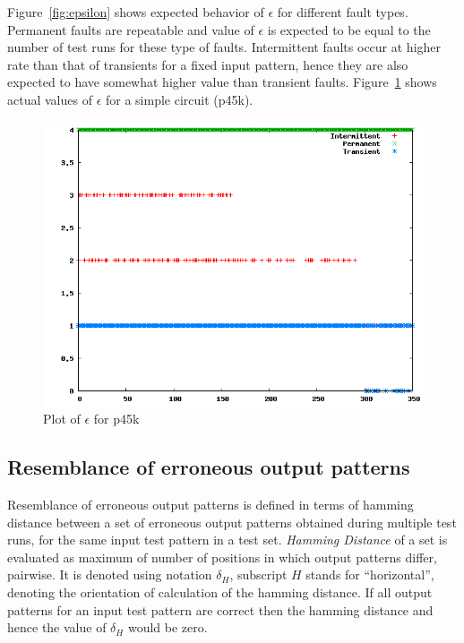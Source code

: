 Figure~\ref{fig:epsilon} shows expected behavior of $\epsilon$ for different fault types. Permanent faults are repeatable and value of $\epsilon$ is expected to be equal to the number of test runs for these type of faults. Intermittent faults occur at higher rate than that of transients for a fixed input pattern, hence they are also expected to have somewhat higher value than transient faults. Figure~\ref{fig:epsilonp45k} shows actual values of $\epsilon$ for a simple circuit (p45k).

\begin{figure}[h]
  \begin{center}
    \captionsetup{justification=centering}
    \includegraphics[scale=0.35]{figures/epsilonp45k.png}
    \caption{Plot of $\epsilon$ for p45k}
    \label{fig:epsilonp45k}
  \end{center}
\end{figure}

\subsection{Resemblance of erroneous output patterns}
Resemblance of erroneous output patterns is defined in terms of hamming distance between a set of erroneous output patterns obtained during multiple test runs, for the same input test pattern in a test set. \emph{Hamming Distance} of a set is evaluated as maximum of number of positions in which output patterns differ, pairwise. It is denoted using notation $\delta_H$, subscript $H$ stands for \enquote{horizontal}, denoting the orientation of calculation of the hamming distance. If all output patterns for an input test pattern are correct then the hamming distance and hence the value of $\delta_H$ would be zero.


